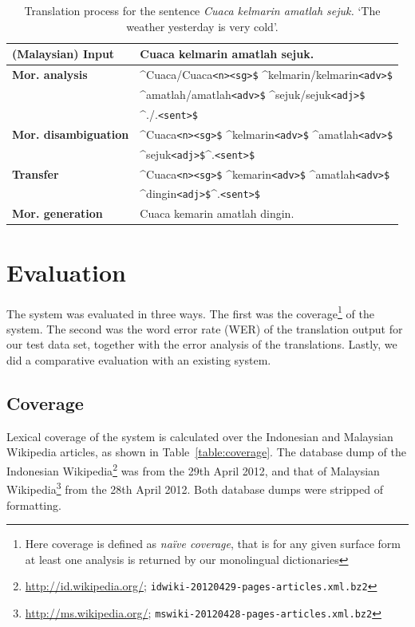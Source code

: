 \documentclass[10pt,a5paper,twoside]{article}
\newcommand{\tag}[1]{{\small{\texttt{#1}}}}
\begin{document}
\begin{table}[htbp]
\centering
\begin{tabular}{ll}
\toprule
{\bf (Malaysian) Input} & Cuaca kelmarin amatlah sejuk. \\ 
\midrule
{\bf Mor. analysis} & \^{}Cuaca/Cuaca\tag{<n>}\tag{<sg>\$} \^{}kelmarin/kelmarin\tag{<adv>\$}\\
~ & \^{}amatlah/amatlah\tag{<adv>\$} \^{}sejuk/sejuk\tag{<adj>\$}\\
~ & \^{}./.\tag{<sent>\$}\\
\midrule
{\bf Mor. disambiguation}& \^{}Cuaca\tag{<n>}\tag{<sg>\$} \^{}kelmarin\tag{<adv>\$} \^{}amatlah\tag{<adv>\$}\\
~ & \^{}sejuk\tag{<adj>\$}\^{}.\tag{<sent>\$} \\
\midrule
{\bf Transfer}& \^{}Cuaca\tag{<n>}\tag{<sg>\$} \^{}kemarin\tag{<adv>\$} \^{}amatlah\tag{<adv>\$}\\
~ & \^{}dingin\tag{<adj>\$}\^{}.\tag{<sent>\$} \\ 
\midrule
{\bf Mor. generation} & Cuaca kemarin amatlah dingin. \\
\bottomrule
\end{tabular}
 \caption{Translation process for the sentence \emph{Cuaca kelmarin amatlah sejuk.} `The weather yesterday is very cold'.}
\end{table}

\section{Evaluation}
\label{sec:eval}
The system was evaluated in three ways. The first was the coverage\footnote{Here coverage is defined as \emph{na\"ive coverage}, that is for any given surface form at least one analysis is returned by our monolingual dictionaries} of the system. The second was the word error rate (WER) of the translation output for our test data set, together with the error analysis of the translations. Lastly, we did a comparative evaluation with an existing system.

\subsection{Coverage}
Lexical coverage of the system is calculated over the Indonesian and Malaysian Wikipedia articles, as shown in Table~\ref{table:coverage}. The database dump of the Indonesian Wikipedia\footnote{\url{http://id.wikipedia.org/}; \texttt{idwiki-20120429-pages-articles.xml.bz2}} was from the 29th April 2012, and that of Malaysian Wikipedia\footnote{\url{http://ms.wikipedia.org/}; \texttt{mswiki-20120428-pages-articles.xml.bz2}} from the 28th April 2012. Both database dumps were stripped of formatting.
\end{document}
